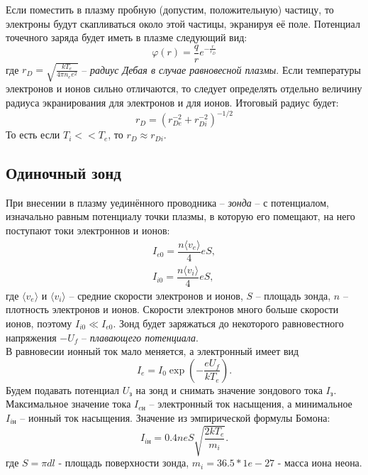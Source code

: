 \documentclass[a4paper,12pt]{article}
\begin{document}
Если поместить в плазму пробную (допустим, положительную) частицу, то электроны будут скапливаться около этой частицы, экранируя её поле. Потенциал точечного заряда будет иметь в плазме следующий вид:
\begin{equation}
    \varphi(r) = \frac{q}{r}e^{-\frac{r}{r_D}}
\end{equation}
где $r_D = \sqrt{\frac{kT_e}{4\pi n_e e^2}}$ -- \textit{радиус Дебая в случае равновесной плазмы}. Если температуры электронов и ионов сильно отличаются, то следует определять отдельно величину радиуса экранирования для электронов и для ионов. Итоговый радиус будет:
\begin{equation}
    r_D = (r_{De}^{-2} + r_{Di}^{-2})^{-1/2}
\end{equation}
То есть если $T_i << T_e$, то $r_D \approx r_{Di}$.


  \subsection*{Одиночный зонд}
  При внесении в плазму уединённого проводника -- \textit{зонда} -- с потенциалом, изначально равным потенциалу точки плазмы, в которую его помещают, на него поступают токи электроннов и ионов:
  \begin{equation}
    \begin{array}{c}
      I_{e0} = \dfrac{n \langle v_e \rangle}{4}eS,\\
      I_{i0} = \dfrac{n \langle v_i \rangle}{4}eS,
    \end{array}
  \end{equation}
  где $\langle v_e \rangle$ и $\langle v_i \rangle$ -- средние скорости электронов и ионов, $S$ -- площадь зонда, $n$ -- плотность электронов и ионов. Скорости электронов много больше скорости ионов, поэтому $I_{i0} \ll I_{e0}$. Зонд будет заряжаться до некоторого равновестного напряжения $-U_f$ -- \textit{плавающего потенциала}.\\
  В равновесии ионный ток мало меняется, а электронный имеет вид
  $$
  I_e = I_0 \exp\left( -\dfrac{eU_f}{kT_e} \right).
  $$
  Будем подавать потенциал $U_\text{з}$ на зонд и снимать значение зондового тока $I_\text{з}$. Максимальное значение тока $I_{e\text{н}}$ -- электронный ток насыщения, а минимальное $I_{i\text{н}}$ -- ионный ток насыщения. Значение из эмпирической формулы Бомона:
  \begin{equation}
    I_{i\text{н}} = 0.4 neS \sqrt{\dfrac{2kT_e}{m_i}}.
  \end{equation}
  где $S = \pi d l$  - площадь поверхности зонда, $m_i = 36.5 * 1e-27$ - масса иона неона.
    
\end{document}
